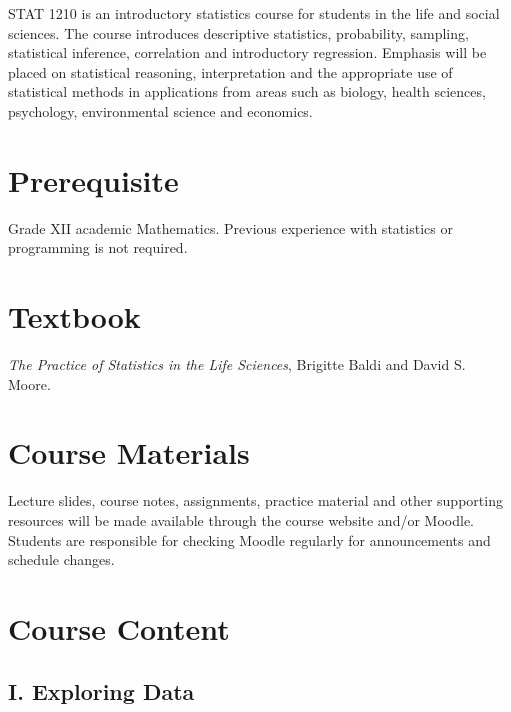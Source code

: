 \documentclass[10pt]{article}
\begin{document}
STAT 1210 is an introductory statistics course for students in the life and social sciences. The course introduces descriptive statistics, probability, sampling, statistical inference, correlation and introductory regression. Emphasis will be placed on statistical reasoning, interpretation and the appropriate use of statistical methods in applications from areas such as biology, health sciences, psychology, environmental science and economics.


\section{Prerequisite}
Grade XII academic Mathematics. Previous experience with statistics or programming is not required.


\section{Textbook}
\textit{The Practice of Statistics in the Life Sciences}, Brigitte Baldi and David S. Moore.


\section{Course Materials}
Lecture slides, course notes, assignments, practice material and other supporting resources will be made available through the course website and/or Moodle. Students are responsible for checking Moodle regularly for announcements and schedule changes.


\section{Course Content}

\subsection{I. Exploring Data}
\end{document}
